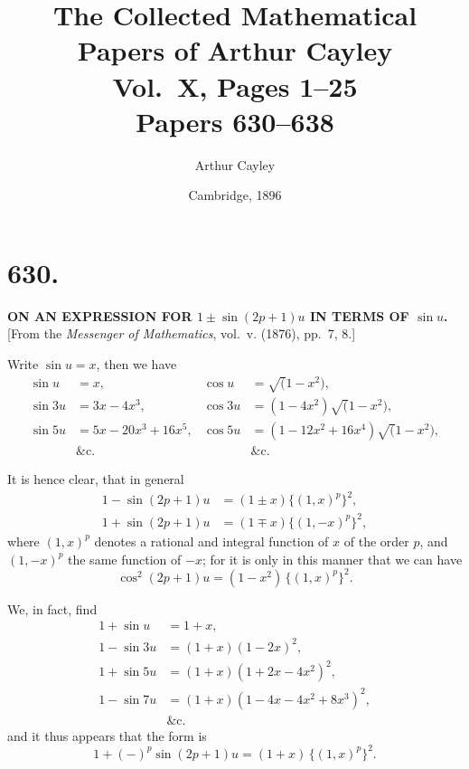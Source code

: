 \documentclass[12pt,a4paper]{article}
\title{The Collected Mathematical Papers of Arthur Cayley\\[6pt]
\large Vol.~X, Pages 1--25 \\[4pt]
\normalsize Papers 630--638}
\author{Arthur Cayley}
\date{Cambridge, 1896}
\begin{document}
\maketitle
\thispagestyle{fancy}

\setcounter{page}{1}

\section*{630.}

\begin{center}
\textbf{ON AN EXPRESSION FOR $1 \pm \sin(2p+1)u$ IN TERMS OF $\sin u$.}\\[1em]
[From the \textit{Messenger of Mathematics}, vol.~v. (1876), pp.~7, 8.]
\end{center}

Write $\sin u = x$, then we have
\begin{align*}
\sin u &= x, & \cos u &= \surd(1-x^2), \\
\sin 3u &= 3x - 4x^3, & \cos 3u &= (1-4x^2)\surd(1-x^2), \\
\sin 5u &= 5x - 20x^3 + 16x^5, & \cos 5u &= (1-12x^2+16x^4)\surd(1-x^2), \\
&\&\text{c.} & &\&\text{c.}
\end{align*}

It is hence clear, that in general
\begin{align*}
1 - \sin(2p+1)u &= (1 \pm x)\{(1, x)^p\}^2, \\
1 + \sin(2p+1)u &= (1 \mp x)\{(1, -x)^p\}^2,
\end{align*}
where $(1, x)^p$ denotes a rational and integral function of $x$ of the order $p$, and $(1, -x)^p$ the same function of $-x$; for it is only in this manner that we can have
\[
\cos^2(2p+1)u = (1-x^2)\,\{(1, x)^p\}^2.
\]

We, in fact, find
\begin{align*}
1 + \sin u &= 1 + x, \\
1 - \sin 3u &= (1+x)(1-2x)^2, \\
1 + \sin 5u &= (1+x)(1+2x-4x^2)^2, \\
1 - \sin 7u &= (1+x)(1-4x-4x^2+8x^3)^2, \\
&\&\text{c.}
\end{align*}
and it thus appears that the form is
\[
1 + (-)^p \sin(2p+1)u = (1+x)\,\{(1, x)^p\}^2.
\]
\end{document}
